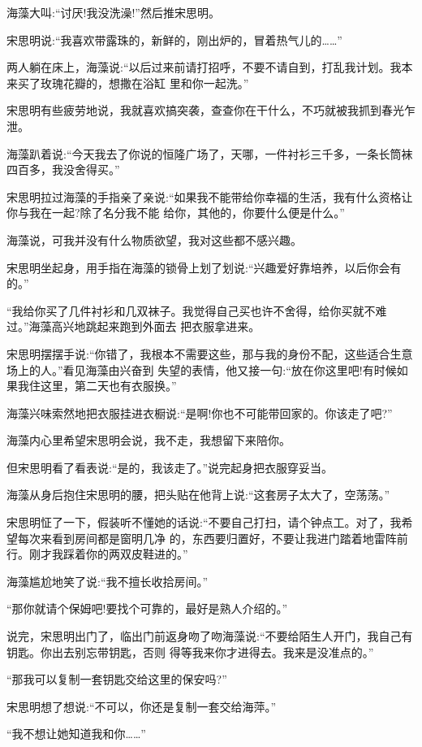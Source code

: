 \documentclass[11pt,a4paper,onecolumn]{article}
\begin{document}
海藻大叫:``讨厌!我没洗澡!''然后推宋思明。

宋思明说:``我喜欢带露珠的，新鲜的，刚出炉的，冒着热气儿的……''

两人躺在床上，海藻说:``以后过来前请打招呼，不要不请自到，打乱我计划。我本来买了玫瑰花瓣的，想撒在浴缸
里和你一起洗。''

宋思明有些疲劳地说，我就喜欢搞突袭，查查你在干什么，不巧就被我抓到春光乍泄。

海藻趴着说:``今天我去了你说的恒隆广场了，天哪，一件衬衫三千多，一条长筒袜四百多，我没舍得买。''

宋思明拉过海藻的手指亲了亲说:``如果我不能带给你幸福的生活，我有什么资格让你与我在一起?除了名分我不能
给你，其他的，你要什么便是什么。''

海藻说，可我并没有什么物质欲望，我对这些都不感兴趣。

宋思明坐起身，用手指在海藻的锁骨上划了划说:``兴趣爱好靠培养，以后你会有的。''

``我给你买了几件衬衫和几双袜子。我觉得自己买也许不舍得，给你买就不难过。''海藻高兴地跳起来跑到外面去
把衣服拿进来。

宋思明摆摆手说:``你错了，我根本不需要这些，那与我的身份不配，这些适合生意场上的人。''看见海藻由兴奋到
失望的表情，他又接一句:``放在你这里吧!有时候如果我住这里，第二天也有衣服换。''

海藻兴味索然地把衣服挂进衣橱说:``是啊!你也不可能带回家的。你该走了吧?''

海藻内心里希望宋思明会说，我不走，我想留下来陪你。

但宋思明看了看表说:``是的，我该走了。''说完起身把衣服穿妥当。

海藻从身后抱住宋思明的腰，把头贴在他背上说:``这套房子太大了，空荡荡。''

宋思明怔了一下，假装听不懂她的话说:``不要自己打扫，请个钟点工。对了，我希望每次来看到房间都是窗明几净
的，东西要归置好，不要让我进门踏着地雷阵前行。刚才我踩着你的两双皮鞋进的。''

海藻尴尬地笑了说:``我不擅长收拾房间。''

``那你就请个保姆吧!要找个可靠的，最好是熟人介绍的。''

说完，宋思明出门了，临出门前返身吻了吻海藻说:``不要给陌生人开门，我自己有钥匙。你出去别忘带钥匙，否则
得等我来你才进得去。我来是没准点的。''

``那我可以复制一套钥匙交给这里的保安吗?''

宋思明想了想说:``不可以，你还是复制一套交给海萍。''

``我不想让她知道我和你……''
\end{document}
